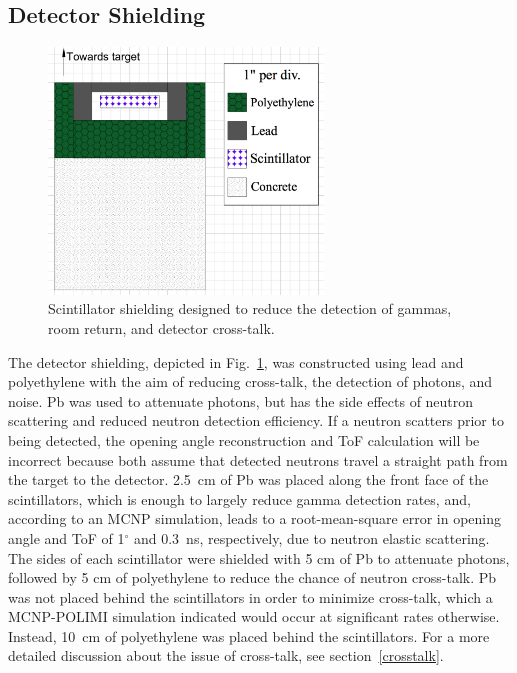 \subsection{Detector Shielding}
\label{shielding}
\begin{figure}
    \centering
    \includegraphics[width = 0.65\textwidth]{Content/Methods/DetShielding.png}
    \caption{Scintillator shielding designed to reduce the detection of gammas, room return, and detector cross-talk.}
    \label{fig:shielding}
\end{figure}
The detector shielding, depicted in Fig.~\ref{fig:shielding}, was constructed using lead and polyethylene with the aim of reducing cross-talk, the detection of photons, and noise.
Pb was used to attenuate photons, but has the side effects of neutron scattering and reduced neutron detection efficiency.
If a neutron scatters prior to being detected, the opening angle reconstruction and ToF calculation will be incorrect because both assume that detected neutrons travel a straight path from the target to the detector.
2.5~cm of Pb was placed along the front face of the scintillators, which is enough to largely reduce gamma detection rates, and, according to an MCNP simulation, leads to a root-mean-square error in opening angle and ToF of 1$^{\circ}$ and 0.3~ns, respectively, due to neutron elastic scattering.
The sides of each scintillator were shielded with 5 cm of Pb to attenuate photons, followed by 5 cm of polyethylene to reduce the chance of neutron cross-talk.
Pb was not placed behind the scintillators in order to minimize cross-talk, which a MCNP-POLIMI simulation indicated would occur at significant rates otherwise.
Instead, 10~cm of polyethylene was placed behind the scintillators.
For a more detailed discussion about the issue of cross-talk, see section~\ref{crosstalk}.

